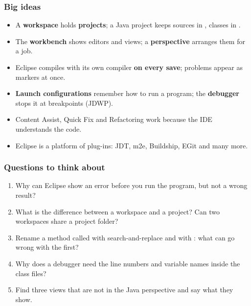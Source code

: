 \documentclass[aspectratio=169,10pt,compress]{beamer}
\begin{document}
\begin{frame}[t,fragile] \frametitle{Big ideas}
  \begin{itemize}
    \item A \textbf{workspace} holds \textbf{projects}; a Java project keeps sources in , classes in .
    \item The \textbf{workbench} shows editors and views; a \textbf{perspective} arranges them for a job.
    \item Eclipse compiles with its own compiler  \textbf{on every save}; problems appear as markers at once.
    \item \textbf{Launch configurations} remember how to run a program; the \textbf{debugger} stops it at breakpoints (JDWP).
    \item Content Assist, Quick Fix and Refactoring work because the IDE understands the code.
    \item Eclipse is a platform of plug-ins: JDT, m2e, Buildship, EGit and many more.
  \end{itemize}
\end{frame}




\begin{frame}[t,fragile] \frametitle{Questions to think about}
  \begin{enumerate}\small
    \item Why can Eclipse show an error before you run the program, but not a wrong result?
    \item What is the difference between a workspace and a project? Can two workspaces share a project folder?
    \item Rename a method called  with search-and-replace and with : what can go wrong with the first?
    \item Why does a debugger need the line numbers and variable names inside the class files?
    \item Find three views that are not in the Java perspective and say what they show.
  \end{enumerate}
\end{frame}




\begin{frame}[t,fragile]
	\begin{center}
		\vspace{4cm}
	\end{center}
\end{frame}
\end{document}

